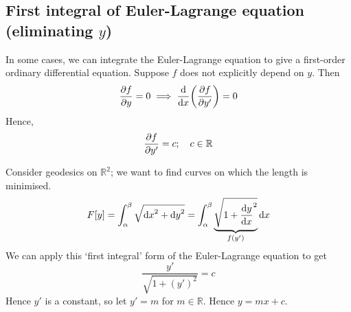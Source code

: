 \subsection{First integral of Euler-Lagrange equation (eliminating \(y\))}
In some cases, we can integrate the Euler-Lagrange equation to give a first-order ordinary differential equation.
Suppose \(f\) does not explicitly depend on \(y\).
Then
\[
	\pdv{f}{y} = 0 \implies \dv{x}\qty(\pdv{f}{y'}) = 0
\]
Hence,
\[
	\pdv{f}{y'} = c;\quad c \in \mathbb R
\]
\begin{example}
	Consider geodesics on \(\mathbb R^2\); we want to find curves on which the length is minimised.
	\[
		F[y] = \int_\alpha^\beta \sqrt{\dd{x}^2 + \dd{y}^2} = \int_\alpha^\beta \underbrace{\sqrt{1 + \dv{y}{x}^2}}_{f(y')}\dd{x}
	\]
	We can apply this `first integral' form of the Euler-Lagrange equation to get
	\[
		\frac{y'}{\sqrt{1 + (y')^2}} = c
	\]
	Hence \(y'\) is a constant, so let \(y' = m\) for \(m \in \mathbb R\).
	Hence \(y = mx + c\).
\end{example}

